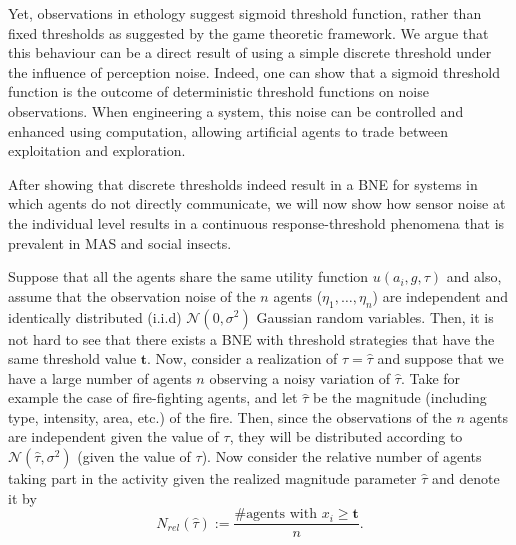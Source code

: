 \documentclass{nature}
\def\td{\mathbf{t}}   %
\begin{document}
Yet, observations in ethology suggest sigmoid threshold function\cite{Bonabeau1996}, rather than fixed thresholds as suggested by the game theoretic framework. We argue that this behaviour can be a direct result of using a simple discrete threshold under the influence of perception noise. Indeed, one can show that a sigmoid threshold function is the outcome of deterministic threshold functions on noise observations. When engineering a system, this noise can be controlled and enhanced using computation, allowing artificial agents to trade between exploitation and exploration. 

After showing that discrete thresholds indeed result in a BNE for systems in which agents do not directly communicate, we will now show how sensor noise at the individual level results in a continuous response-threshold phenomena that is prevalent in MAS and social insects. 

Suppose that all the agents share the same utility function $u(a_i,g,\tau)$ and also, assume that the observation noise of the $n$ agents ($\eta_1,\ldots,\eta_n$) are independent and identically distributed (i.i.d) $\mathcal{N}(0,\sigma^2)$ Gaussian random variables. Then, it is not hard to see that there exists a BNE with threshold strategies that have the same threshold value $\td$\cite{Morris2000}. Now, consider a realization of $\tau=\hat{\tau}$ and suppose that we have a large number of agents $n$ observing a noisy variation of $\hat{\tau}$. Take for example the case of fire-fighting agents, and let $\hat{\tau}$ be the magnitude (including type, intensity, area, etc.) of the fire. Then, since the observations of the $n$ agents are independent given the value of $\tau$, they will be distributed according to $\mathcal{N}(\hat{\tau},\sigma^2)$ (given the value of $\tau$). Now consider the relative number of agents taking part in the activity given the realized magnitude parameter $\hat{\tau}$ and denote it by 
\begin{equation}\label{eqn:Nrel}
	N_{rel}(\hat{\tau}):=\frac{\#\text{agents with }x_i\geq \td}{n}.
\end{equation}
\end{document}
